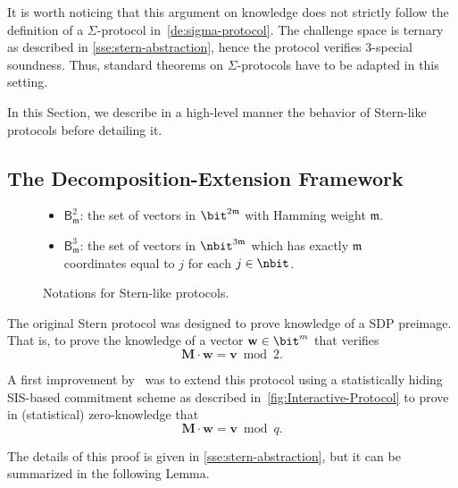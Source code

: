 It is worth noticing that this argument on knowledge does not strictly follow the definition of a $\Sigma$-protocol in~\cref{de:sigma-protocol}. The challenge space is ternary as described in \cref{sse:stern-abstraction}, hence the protocol verifies $3$-special soundness.
Thus, standard theorems on $\Sigma$-protocols have to be adapted in this setting.

In this Section, we describe in a high-level manner the behavior of Stern-like protocols before detailing it.


\subsection{The Decomposition-Extension Framework} \label{sse:stern-dec-ext}

\begin{figure}[h]
  \begin{itemize}
    \item $\mathsf{B}^{2}_{\mathfrak m}$: the set of vectors in $\bit^{2\mathfrak m}$ with Hamming weight $\mathfrak m$.
    \item $\mathsf{B}^{3}_{\mathfrak m}$: the set of vectors in $\nbit^{3\mathfrak m}$ which has exactly $\mathfrak m$ coordinates equal to $j$ for each $j \in \nbit$.
  \end{itemize}
  \caption{Notations for Stern-like protocols.}
  \label{fig:stern-notations}
\end{figure}

The original Stern protocol was designed to prove knowledge of a SDP preimage. That is, to prove the knowledge of a vector $\mathbf{w} \in \bit^m$ that verifies
\begin{equation} \label{eq:sdp-statement}
  \mathbf{M} \cdot \mathbf{w} = \mathbf{v} \bmod 2.
\end{equation}

A first improvement by~\cite{KTX08} was to extend this protocol using a statistically hiding SIS-based commitment scheme as described in~\ref{fig:Interactive-Protocol} to prove in (statistical) zero-knowledge that
\begin{equation} \label{eq:isis-stern-relation}
  \mathbf{M} \cdot \mathbf{w} = \mathbf{v} \bmod q.
\end{equation}

The details of this proof is given in \cref{sse:stern-abstraction}, but it can be summarized in the following Lemma.

